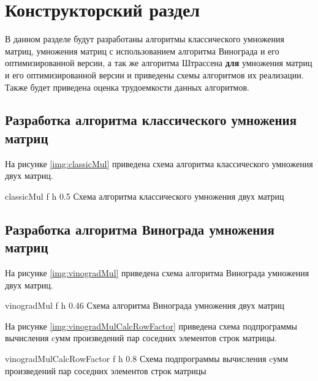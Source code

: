 \chapter{Конструкторский раздел}

В данном разделе будут разработаны алгоритмы классического умножения матриц, умножения матриц с использованием алгоритма Винограда и его оптимизированной версии, а так же алгоритма Штрассена \textbf{для} умножения матриц и его оптимизированной версии и приведены схемы алгоритмов их реализации. Также будет приведена оценка трудоемкости данных алгоритмов.

\section{Разработка алгоритма классического умножения матриц}

На рисунке \ref{img:classicMul} приведена схема алгоритма классического умножения двух матриц.

{classicMul} %
{f} %
{h} %
{0.5\textwidth} %
{Схема алгоритма классического умножения двух матриц} %
 
\clearpage

\section{Разработка алгоритма Винограда умножения матриц}

На рисунке \ref{img:vinogradMul} приведена схема алгоритма Винограда умножения двух матриц.

{vinogradMul} %
{f} %
{h} %
{0.46\textwidth} %
{Схема алгоритма Винограда умножения двух матриц} %

\clearpage

На рисунке \ref{img:vinogradMulCalcRowFactor} приведена схема подпрограммы вычисления cумм произведений пар соседних элементов строк матрицы.

{vinogradMulCalcRowFactor} %
{f} %
{h} %
{0.8\textwidth} %
{Схема подпрограммы вычисления cумм произведений пар соседних элементов строк матрицы} %

